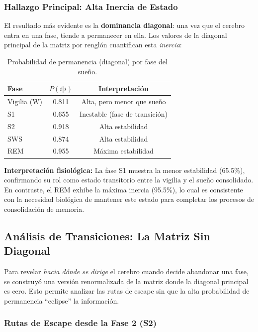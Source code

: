 \subsubsection{Hallazgo Principal: Alta Inercia de Estado}

El resultado más evidente es la \textbf{dominancia diagonal}: una vez que el cerebro entra en una fase, tiende a permanecer en ella. Los valores de la diagonal principal de la matriz por renglón cuantifican esta \textit{inercia}:

\begin{table}[htbp]
\centering
\caption{Probabilidad de permanencia (diagonal) por fase del sueño.}
\label{tab:diagonal_global}
\begin{tabular}{lcc}
\hline
\textbf{Fase} & \textbf{$P(i|i)$} & \textbf{Interpretación} \\
\hline
Vigilia (W) & 0.811 & Alta, pero menor que sueño \\
S1 & 0.655 & Inestable (fase de transición) \\
S2 & 0.918 & Alta estabilidad \\
SWS & 0.874 & Alta estabilidad \\
REM & 0.955 & Máxima estabilidad \\
\hline
\end{tabular}
\end{table}

\textbf{Interpretación fisiológica:} La fase S1 muestra la menor estabilidad (65.5\%), confirmando su rol como estado transitorio entre la vigilia y el sueño consolidado. En contraste, el REM exhibe la máxima inercia (95.5\%), lo cual es consistente con la necesidad biológica de mantener este estado para completar los procesos de consolidación de memoria.

\subsection{Análisis de Transiciones: La Matriz Sin Diagonal}

Para revelar \textit{hacia dónde se dirige} el cerebro cuando decide abandonar una fase, se construyó una versión renormalizada de la matriz donde la diagonal principal es cero. Esto permite analizar las rutas de escape sin que la alta probabilidad de permanencia ``eclipse'' la información.

\subsubsection{Rutas de Escape desde la Fase 2 (S2)}

